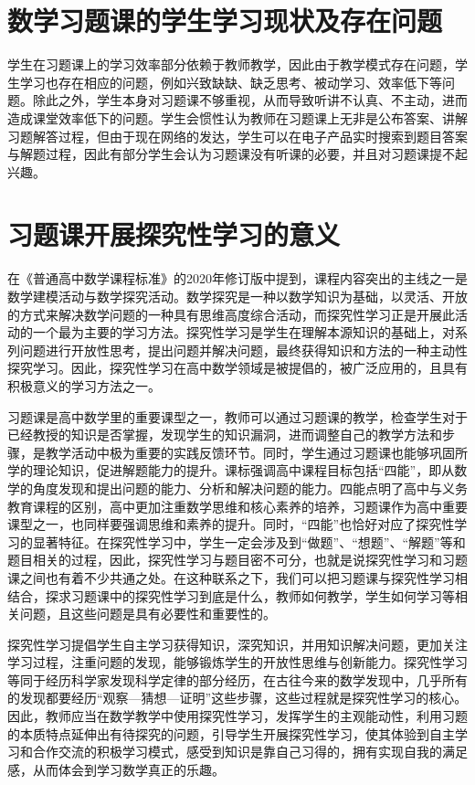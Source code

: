 \section{数学习题课的学生学习现状及存在问题}

学生在习题课上的学习效率部分依赖于教师教学，因此由于教学模式存在问题，学生学习也存在相应的问题，例如兴致缺缺、缺乏思考、被动学习、效率低下等问题。除此之外，学生本身对习题课不够重视，从而导致听讲不认真、不主动，进而造成课堂效率低下的问题。学生会惯性认为教师在习题课上无非是公布答案、讲解习题解答过程，但由于现在网络的发达，学生可以在电子产品实时搜索到题目答案与解题过程，因此有部分学生会认为习题课没有听课的必要，并且对习题课提不起兴趣。



\section{习题课开展探究性学习的意义}

在《普通高中数学课程标准》的2020年修订版中提到，课程内容突出的主线之一是数学建模活动与数学探究活动\cite{普通高中数学课程标准}。数学探究是一种以数学知识为基础，以灵活、开放的方式来解决数学问题的一种具有思维高度综合活动，而探究性学习正是开展此活动的一个最为主要的学习方法。探究性学习是学生在理解本源知识的基础上，对系列问题进行开放性思考，提出问题并解决问题，最终获得知识和方法的一种主动性探究学习。因此，探究性学习在高中数学领域是被提倡的，被广泛应用的，且具有积极意义的学习方法之一。

习题课是高中数学里的重要课型之一，教师可以通过习题课的教学，检查学生对于已经教授的知识是否掌握，发现学生的知识漏洞，进而调整自己的教学方法和步骤，是教学活动中极为重要的实践反馈环节。同时，学生通过习题课也能够巩固所学的理论知识，促进解题能力的提升。课标强调高中课程目标包括“四能”，即从数学的角度发现和提出问题的能力、分析和解决问题的能力\cite{普通高中数学课程标准}。四能点明了高中与义务教育课程的区别，高中更加注重数学思维和核心素养的培养，习题课作为高中重要课型之一，也同样要强调思维和素养的提升。同时，“四能”也恰好对应了探究性学习的显著特征。在探究性学习中，学生一定会涉及到“做题”、“想题”、“解题”等和题目相关的过程，因此，探究性学习与题目密不可分，也就是说探究性学习和习题课之间也有着不少共通之处。在这种联系之下，我们可以把习题课与探究性学习相结合，探求习题课中的探究性学习到底是什么，教师如何教学，学生如何学习等相关问题，且这些问题是具有必要性和重要性的。

探究性学习提倡学生自主学习获得知识，深究知识，并用知识解决问题，更加关注学习过程，注重问题的发现，能够锻炼学生的开放性思维与创新能力。探究性学习等同于经历科学家发现科学定律的部分经历，在古往今来的数学发现中，几乎所有的发现都要经历“观察—猜想—证明”这些步骤，这些过程就是探究性学习的核心。因此，教师应当在数学教学中使用探究性学习，发挥学生的主观能动性，利用习题的本质特点延伸出有待探究的问题，引导学生开展探究性学习，使其体验到自主学习和合作交流的积极学习模式，感受到知识是靠自己习得的，拥有实现自我的满足感，从而体会到学习数学真正的乐趣。



